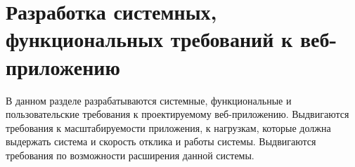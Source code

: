 





\section{Разработка системных, функциональных требований к веб-приложению}
\begin{annotation}
	В данном разделе разрабатываются системные, функциональные и пользовательские требования к
	проектируемому веб-приложению. Выдвигаются требования к масштабируемости приложения,
	к нагрузкам, которые должна выдержать система и скорость отклика и работы системы.
	Выдвигаются требования по возможности расширения данной системы.
\end{annotation}




